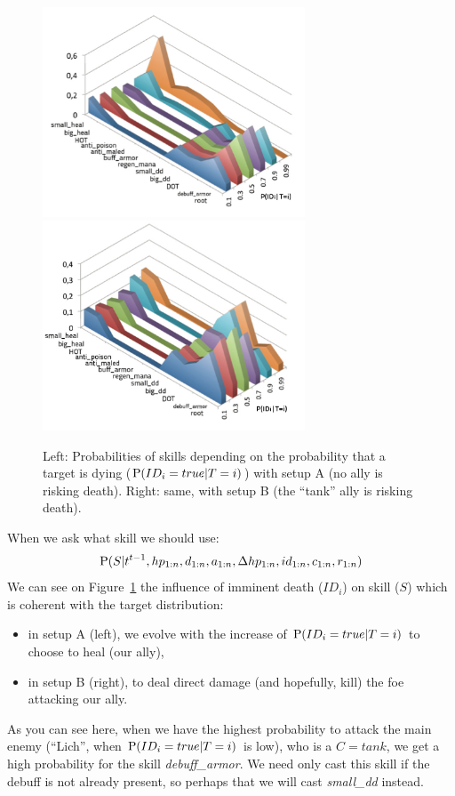 \begin{figure}[h!]
\begin{center}
\includegraphics[width=7.8cm]{images/wow_distrib_skill1.png} \includegraphics[width=7.8cm]{images/wow_distrib_skill2.png}
\caption{Left: Probabilities of skills depending on the probability that a target is dying ($\mathrm{P}(ID_i=true|T=i)$) with setup A (no ally is risking death). Right: same, with setup B (the ``tank'' ally is risking death).}
\label{fig:wow_skill}
\end{center}
\end{figure}


When we ask what skill we should use:
$$\mathrm{P}(S|t^{t-1},hp_{1:n},d_{1:n}, a_{1:n}, \Delta hp_{1:n}, id_{1:n}, c_{1:n}, r_{1:n})$$
We can see on Figure~\ref{fig:wow_skill} the influence of imminent death ($ID_i$) on skill ($S$) which is coherent with the target distribution: 
\begin{itemize}
    \item in setup A (left), we evolve with the increase of $\mathrm{P}(ID_i=true|T=i)$ to choose to heal (our ally), 
    \item in setup B (right), to deal direct damage (and hopefully, kill) the foe attacking our ally.
\end{itemize} 
As you can see here, when we have the highest probability to attack the main enemy (``Lich'', when $\mathrm{P}(ID_i=true|T=i)$ is low), who is a $C=tank$, we get a high probability for the skill \textit{debuff\_armor}. We need only cast this skill if the debuff is not already present, so perhaps that we will cast \textit{small\_dd} instead. 


